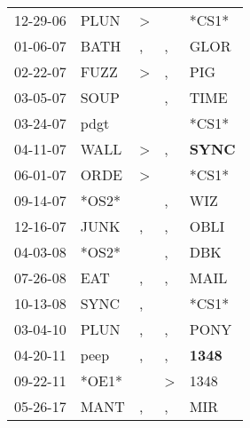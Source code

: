\begin{supertabular}{p{0.07\textwidth}p{0.06\textwidth}p{0.02\textwidth}p{0.02\textwidth}p{0.06\textwidth}}
 12-29-06\textsuperscript{} &  PLUN\textsuperscript{} &  \textgreater &               &                            *CS1* \\
 01-06-07\textsuperscript{} &  BATH\textsuperscript{} &             , &             , &           GLOR\textsuperscript{} \\
 02-22-07\textsuperscript{} &  FUZZ\textsuperscript{} &  \textgreater &             , &            PIG\textsuperscript{} \\
 03-05-07\textsuperscript{} &  SOUP\textsuperscript{} &               &             , &           TIME\textsuperscript{} \\
 03-24-07\textsuperscript{} &  pdgt\textsuperscript{} &               &               &                            *CS1* \\
 04-11-07\textsuperscript{} &  WALL\textsuperscript{} &  \textgreater &             , &  \textbf{SYNC\textsuperscript{}} \\
 06-01-07\textsuperscript{} &  ORDE\textsuperscript{} &  \textgreater &               &                            *CS1* \\
 09-14-07\textsuperscript{} &                   *OS2* &               &             , &            WIZ\textsuperscript{} \\
 12-16-07\textsuperscript{} &  JUNK\textsuperscript{} &             , &             , &           OBLI\textsuperscript{} \\
 04-03-08\textsuperscript{} &                   *OS2* &               &             , &            DBK\textsuperscript{} \\
 07-26-08\textsuperscript{} &   EAT\textsuperscript{} &             , &             , &           MAIL\textsuperscript{} \\
 10-13-08\textsuperscript{} &  SYNC\textsuperscript{} &             , &               &                            *CS1* \\
 03-04-10\textsuperscript{} &  PLUN\textsuperscript{} &             , &             , &           PONY\textsuperscript{} \\
 04-20-11\textsuperscript{} &  peep\textsuperscript{} &             , &             , &  \textbf{1348\textsuperscript{}} \\
 09-22-11\textsuperscript{} &                   *OE1* &               &  \textgreater &           1348\textsuperscript{} \\
 05-26-17\textsuperscript{} &  MANT\textsuperscript{} &             , &             , &            MIR\textsuperscript{} \\
\end{supertabular}
